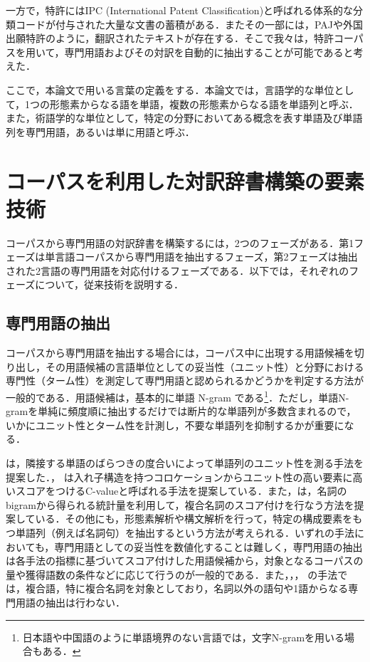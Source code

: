 \documentclass[japanese]{jnlp_1.3e}
\begin{document}
一方で，特許にはIPC (International Patent Classification)と呼ばれる体系的な分類コードが付与された大量な文書の蓄積がある．またその一部には，PAJや外国出願特許のように，翻訳されたテキストが存在する．そこで我々は，特許コーパスを用いて，専門用語およびその対訳を自動的に抽出することが可能であると考えた．

ここで，本論文で用いる言葉の定義をする．本論文では，言語学的な単位として，1つの形態素からなる語を単語，複数の形態素からなる語を単語列と呼ぶ．また，術語学的な単位として，特定の分野においてある概念を表す単語及び単語列を専門用語，あるいは単に用語と呼ぶ．


\section{コーパスを利用した対訳辞書構築の要素技術}

コーパスから専門用語の対訳辞書を構築するには，2つのフェーズがある．第1フェーズは単言語コーパスから専門用語を抽出するフェーズ，第2フェーズは抽出された2言語の専門用語を対応付けるフェーズである．以下では，それぞれのフェーズについて，従来技術を説明する．

\subsection{専門用語の抽出}

コーパスから専門用語を抽出する場合には，コーパス中に出現する用語候補を切り出し，その用語候補の言語単位としての妥当性（ユニット性）と分野における専門性（ターム性）を測定して専門用語と認められるかどうかを判定する方法が一般的である．用語候補は，基本的に単語 N-gram である\footnote{日本語や中国語のように単語境界のない言語では，文字N-gramを用いる場合もある．}．ただし，単語N-gramを単純に頻度順に抽出するだけでは断片的な単語列が多数含まれるので，いかにユニット性とターム性を計測し，不要な単語列を抑制するかが重要になる．

\cite{Shimohata97} は，隣接する単語のばらつきの度合いによって単語列のユニット性を測る手法を提案した．\cite{Ananiadou94}， \cite{Frantzi_and_Ananiadou99}は入れ子構造を持つコロケーションからユニット性の高い要素に高いスコアをつけるC-valueと呼ばれる手法を提案している．また，\cite{Nakagawa03}は，名詞のbigramから得られる統計量を利用して，複合名詞のスコア付けを行なう方法を提案している．その他にも，形態素解析や構文解析を行って，特定の構成要素をもつ単語列（例えば名詞句）を抽出するという方法が考えられる．いずれの手法においても，専門用語としての妥当性を数値化することは難しく，専門用語の抽出は各手法の指標に基づいてスコア付けした用語候補から，対象となるコーパスの量や獲得語数の条件などに応じて行うのが一般的である．また，\cite{Ananiadou94}，\cite{Frantzi_and_Ananiadou99}， \cite{Nakagawa03}の手法では，複合語，特に複合名詞を対象としており，名詞以外の語句や1語からなる専門用語の抽出は行わない．
\end{document}
